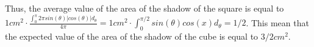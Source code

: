 \begin{solution}
 Thus, the average value of the area of the shadow of the square is equal to $1cm^2 \cdot \frac{\int_{0}^{\pi} 2\pi sin(\theta) |cos(\theta)| d_\theta}{4\pi} = 1cm^2 \cdot \int_{0}^{\pi/2}sin(\theta) cos(x) d_\theta =1/2$. This mean that the  expected value of the area of the shadow of the cube is equal to $3/2 cm^2$.
\end{solution}
